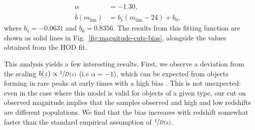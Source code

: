 \documentclass[a4paper,11pt]{article}
\begin{document}
    \begin{equation}
      \begin{aligned}
        \alpha &= -1.30, \\
        \bar{b}(m_{\mathrm{lim}}) &= b_{1}(m_{\mathrm{lim}}-24) + b_{0},
        \label{eq:bias-fit-func-result}
      \end{aligned}
    \end{equation}
    where $b_{1} = -0.0631$ and $b_{0} = 0.8356$. The results from this fitting function are shown as solid lines in Fig.~\ref{fig:magnitude-cuts-bias}, alongside the values obtained from the HOD fit.

    This analysis yields a few interesting results. First, we observe a deviation from the scaling $b(z) \propto \sfrac{1}{D(z)}$ (i.e $\alpha=-1$), which can be expected from objects forming in rare peaks at early times with a high bias \cite{1986ApJ...304...15B,1996MNRAS.282..347M,1998ApJ...500L..79T,Coil:2004}. This is not unexpected: even in the case where this model is valid for objects of a given type, our cut on observed magnitude implies that the samples observed and high and low redshifts are different populations. We find that the bias increases with redshift somewhat faster than the standard empirical assumption of $\sfrac{1}{D(z)}$.
\end{document}
